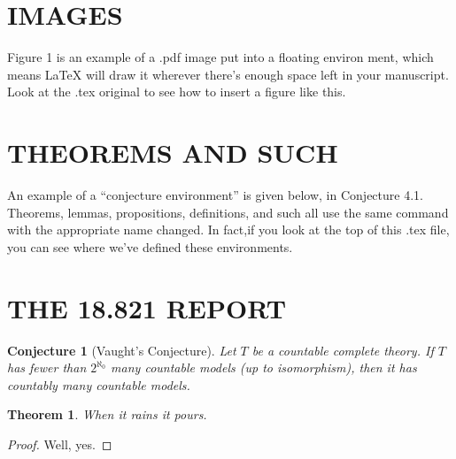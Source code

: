\documentclass[leqno]{article}
\newtheorem{conjecture}{Conjecture}[section]
\newtheorem{theorem}{Theorem}[section]
\begin{document}
	\section{IMAGES}
	\hspace{0.5 cm}Figure 1 is an example of a .pdf image put into a ﬂoating environ­
	ment, which means LaTeX will draw it wherever there’s enough space
	left in your manuscript. Look at the .tex original to see how to insert
	a ﬁgure like this.
	\section{THEOREMS AND SUCH}
	\hspace{0.5 cm}An example of a “conjecture environment” is given below, in Con­jecture 4.1. Theorems, lemmas, propositions, deﬁnitions, and such all
	use the same command with the appropriate name changed. In fact,if you look at the top of this .tex ﬁle, you can see where we’ve deﬁned
	these environments.\\
	\newpage
	\section*{THE 18.821 REPORT}
	\begin{conjecture}[Vaught’s Conjecture]
		Let $T$ be a countable complete theory. If $T$ has fewer than $2^{\aleph_0}$ many countable models (up to isomorphism), then it has countably many countable models.
	\end{conjecture}
	
	\begin{theorem}
		When it rains it pours.
	\end{theorem}
	\begin{proof}
		Well, yes.
	\end{proof}
\end{document}

